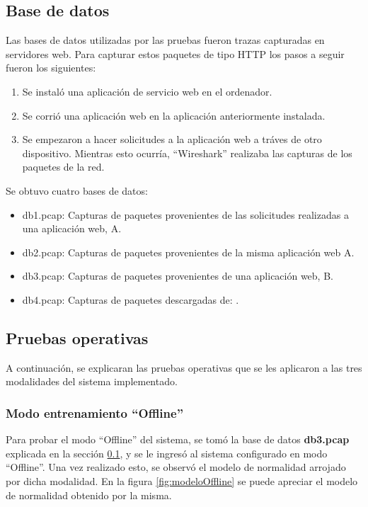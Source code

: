\subsection{Base de datos}\label{ssec:DB}

Las bases de datos utilizadas por las pruebas fueron trazas capturadas
en servidores web. Para capturar estos paquetes de tipo HTTP los pasos a
seguir fueron los siguientes:

\begin{enumerate}
\item Se instaló una aplicación de servicio web en el ordenador.
\item Se corrió una aplicación web en la aplicación anteriormente instalada.
\item Se empezaron a hacer solicitudes a la aplicación web a tráves de otro
dispositivo. Mientras esto ocurría, ``Wireshark'' realizaba las capturas
de los paquetes de la red.
\end{enumerate}
Se obtuvo cuatro bases de datos:
\begin{itemize}
\item db1.pcap: Capturas de paquetes provenientes de las solicitudes realizadas a una aplicación web, A.
\item db2.pcap: Capturas de paquetes provenientes de la misma aplicación
web A.
\item db3.pcap: Capturas de paquetes provenientes de una aplicación web,
B.
\item db4.pcap: Capturas de paquetes descargadas de: \cite{wireshark}.
\end{itemize}

\subsection{Pruebas operativas}

A continuación, se explicaran las pruebas operativas que se les aplicaron
a las tres modalidades del sistema implementado.

\subsubsection{Modo entrenamiento ``Offline''}

Para probar el modo ``Offline'' del sistema, se tomó la base de datos \textbf{db3.pcap} explicada en la sección \ref{ssec:DB}, y se le ingresó al sistema configurado en modo ``Offline''. Una vez realizado esto, se observó el modelo de
normalidad arrojado por dicha modalidad.
En la figura \ref{fig:modeloOffline} se puede apreciar el modelo de normalidad obtenido
por la misma.

